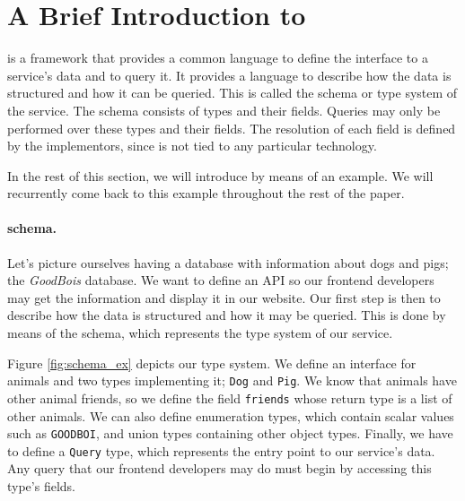 \section{A Brief Introduction to \gql}\label{sec:bg}

\gql is a framework that provides a common language to define the interface to a service's data and to query it.
It provides a language to describe how the data is structured and how it can be queried. This is called the schema or type system of the service. The schema consists of types and their fields. Queries may only be performed over these types and their fields. The resolution of each field is defined by the implementors, since \gql is not tied to any particular technology.

In the rest of this section, we will introduce \gql by means of an example. We will recurrently come back to this example throughout the rest of the paper.

\paragraph{\gql schema.}

Let's picture ourselves having a database with information about dogs and pigs; the \textit{GoodBois} database. We want to define an API so our frontend developers may get the information and display it in our website. Our first step is then to describe how the data is structured and how it may be queried. This is done by means of the schema, which represents the type system of our \gql service.

Figure \ref{fig:schema_ex} depicts our type system. We define an interface for animals and two types implementing it; \texttt{Dog} and \texttt{Pig}. We know that animals have other animal friends, so we define the field \texttt{friends} whose return type is a list of other animals. We can also define enumeration types, which contain scalar values such as \texttt{GOODBOI}, and union types containing other object types. Finally, we have to define a \texttt{Query} type, which represents the entry point to our service's data. Any query that our frontend developers may do must begin by accessing this type's fields.

